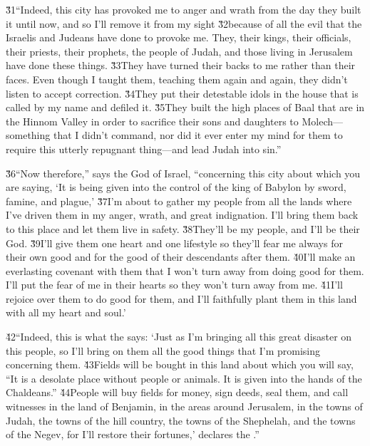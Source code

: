 \v{31}``Indeed, this city has provoked me to anger and wrath from the day they built it until now, and so I'll remove it from my sight \v{32}because of all the evil that the Israelis and Judeans have done to provoke me. They, their kings, their officials, their priests, their prophets, the people of Judah, and those living in Jerusalem have done these things. \v{33}They have turned their backs to me rather than their faces. Even though I taught them, teaching them again and again, they didn't listen to accept correction. \v{34}They put their detestable idols in the house that is called by my name and defiled it. \v{35}They built the high places of Baal that are in the Hinnom Valley in order to sacrifice their sons and daughters to Molech---something that I didn't command, nor did it ever enter my mind for them to require this utterly repugnant thing---and lead Judah into sin.''

\v{36}``Now therefore,'' says the  God of Israel, ``concerning this city about which you are saying, `It is being given into the control of the king of Babylon by sword, famine, and plague,' \v{37}I'm about to gather my people from all the lands where I've driven them in my anger, wrath, and great indignation. I'll bring them back to this place and let them live in safety. \v{38}They'll be my people, and I'll be their God. \v{39}I'll give them one heart and one lifestyle so they'll fear me always for their own good and for the good of their descendants after them. \v{40}I'll make an everlasting covenant with them that I won't turn away from doing good for them. I'll put the fear of me in their hearts so they won't turn away from me. \v{41}I'll rejoice over them to do good for them, and I'll faithfully plant them in this land with all my heart and soul.'

\v{42}``Indeed, this is what the  says: `Just as I'm bringing all this great disaster on this people, so I'll bring on them all the good things that I'm promising concerning them. \v{43}Fields will be bought in this land about which you will say, ``It is a desolate place without people or animals. It is given into the hands of the Chaldeans.'' \v{44}People will buy fields for money, sign deeds, seal them, and call witnesses in the land of Benjamin, in the areas around Jerusalem, in the towns of Judah, the towns of the hill country, the towns of the Shephelah, and the towns of the Negev, for I'll restore their fortunes,' declares the .''

